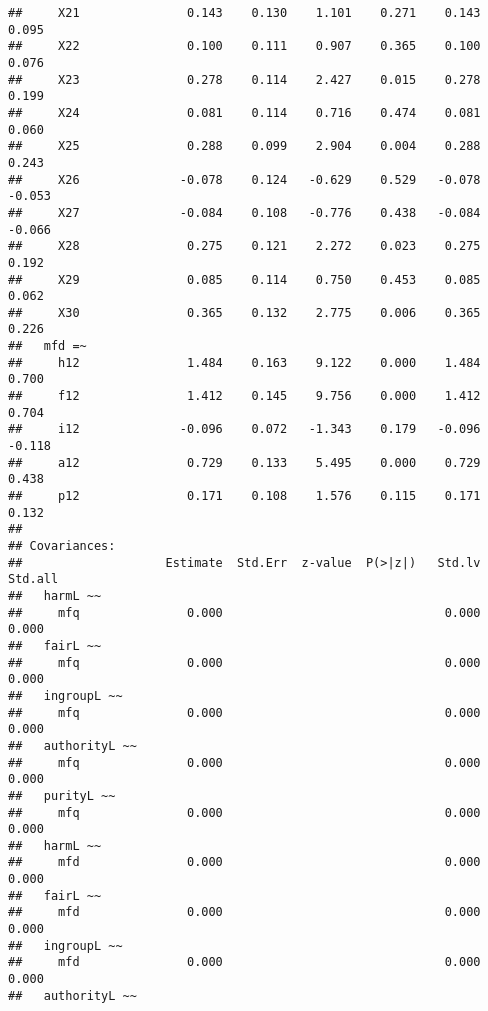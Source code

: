 \documentclass[english,man]{apa6}
\newcounter{author}
\theoremstyle{definition}
\theoremstyle{definition}
\theoremstyle{definition}
\theoremstyle{remark}
\begin{document}
\begin{verbatim}
##     X21               0.143    0.130    1.101    0.271    0.143    0.095
##     X22               0.100    0.111    0.907    0.365    0.100    0.076
##     X23               0.278    0.114    2.427    0.015    0.278    0.199
##     X24               0.081    0.114    0.716    0.474    0.081    0.060
##     X25               0.288    0.099    2.904    0.004    0.288    0.243
##     X26              -0.078    0.124   -0.629    0.529   -0.078   -0.053
##     X27              -0.084    0.108   -0.776    0.438   -0.084   -0.066
##     X28               0.275    0.121    2.272    0.023    0.275    0.192
##     X29               0.085    0.114    0.750    0.453    0.085    0.062
##     X30               0.365    0.132    2.775    0.006    0.365    0.226
##   mfd =~                                                                
##     h12               1.484    0.163    9.122    0.000    1.484    0.700
##     f12               1.412    0.145    9.756    0.000    1.412    0.704
##     i12              -0.096    0.072   -1.343    0.179   -0.096   -0.118
##     a12               0.729    0.133    5.495    0.000    0.729    0.438
##     p12               0.171    0.108    1.576    0.115    0.171    0.132
## 
## Covariances:
##                    Estimate  Std.Err  z-value  P(>|z|)   Std.lv  Std.all
##   harmL ~~                                                              
##     mfq               0.000                               0.000    0.000
##   fairL ~~                                                              
##     mfq               0.000                               0.000    0.000
##   ingroupL ~~                                                           
##     mfq               0.000                               0.000    0.000
##   authorityL ~~                                                         
##     mfq               0.000                               0.000    0.000
##   purityL ~~                                                            
##     mfq               0.000                               0.000    0.000
##   harmL ~~                                                              
##     mfd               0.000                               0.000    0.000
##   fairL ~~                                                              
##     mfd               0.000                               0.000    0.000
##   ingroupL ~~                                                           
##     mfd               0.000                               0.000    0.000
##   authorityL ~~                                                         

\end{verbatim}
\end{document}
